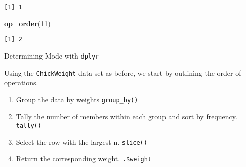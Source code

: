 \documentclass[12pt,]{article}
\newenvironment{Shaded}{\begin{snugshade}}{\end{snugshade}}
\newcommand{\KeywordTok}[1]{\textcolor[rgb]{0.13,0.29,0.53}{\textbf{#1}}}
\newcommand{\DataTypeTok}[1]{\textcolor[rgb]{0.13,0.29,0.53}{#1}}
\newcommand{\DecValTok}[1]{\textcolor[rgb]{0.00,0.00,0.81}{#1}}
\newcommand{\StringTok}[1]{\textcolor[rgb]{0.31,0.60,0.02}{#1}}
\newcommand{\OtherTok}[1]{\textcolor[rgb]{0.56,0.35,0.01}{#1}}
\newcommand{\OperatorTok}[1]{\textcolor[rgb]{0.81,0.36,0.00}{\textbf{#1}}}
\newcommand{\NormalTok}[1]{#1}
\providecommand{\tightlist}{%
  \setlength{\itemsep}{0pt}\setlength{\parskip}{0pt}}
\theoremstyle{definition}
\theoremstyle{definition}
\theoremstyle{definition}
\theoremstyle{remark}
\begin{document}
\begin{Shaded}
\end{Shaded}

\begin{verbatim}
[1] 1
\end{verbatim}

\begin{Shaded}
\begin{Highlighting}[]
\KeywordTok{op_order}\NormalTok{(}\DecValTok{11}\NormalTok{)}
\end{Highlighting}
\end{Shaded}

\begin{verbatim}
[1] 2
\end{verbatim}

Determining Mode with \texttt{dplyr}

Using the \texttt{ChickWeight} data-set as before, we start by outlining
the order of operations.

\begin{enumerate}
\def\labelenumi{\arabic{enumi}.}
\tightlist
\item
  Group the data by weights \texttt{group\_by()}
\item
  Tally the number of members within each group and sort by frequency.
  \texttt{tally()}
\item
  Select the row with the largest n. \texttt{slice()}
\item
  Return the corresponding weight. \texttt{.\$weight}
\end{enumerate}

\begin{Shaded}
\end{Shaded}
\end{document}
